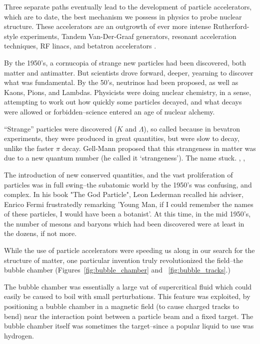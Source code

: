 Three separate paths eventually lead to the development of particle
accelerators, which are to date, the best mechanism we possess in physics to
probe nuclear structure. These accelerators are an outgrowth
of ever more intense Rutherford-style experiments, Tandem Van-Der-Graaf
generators, resonant acceleration techniques, RF linacs, and betatron
accelerators \cite{Bryant1994}.

By the 1950's, a cornucopia of strange new particles had been discovered, both
matter and antimatter. But scientists drove forward, deeper, yearning to
discover what was fundamental. By the 50's, neutrinos had been proposed, as well
as Kaons, Pions, and Lambdas. Physicists were doing nuclear chemistry, in a
sense, attempting to work out how quickly some particles decayed, and what
decays were allowed or forbidden--science entered an age of nuclear alchemy.

``Strange'' particles were discovered ($K$ and $\Lambda$), so called because in
bevatron experiments, they were produced in great quantities, but were slow to
decay, unlike the faster $\pi$ decay. Gell-Mann proposed that this strangeness
in matter was due to a new quantum number (he called it `strangeness'). The name
stuck.
 \cite{Gell-Mann1953}, \cite{Gell-Mann1956}, \cite{Krauss2015}

The introduction of new conserved quantities, and the vast proliferation of
particles was in full swing--the subatomic world by the 1950's was confusing,
and complex. In his book "The God Particle", Leon Lederman recalled his adviser,
Enrico Fermi frustratedly remarking 'Young Man, if I could remember the names of
these particles, I would have been a botanist'. At this time, in the mid 1950's,
the number of mesons and baryons which had been discovered were at least in the
dozens, if not more.

While the use of particle accelerators were speeding us along in  our search for
the structure of matter, one particular invention truly revolutionized the
field--the bubble chamber (Figures~\ref{fig:bubble_chamber} and
~\ref{fig:bubble_tracks}.)

The bubble chamber was essentially a large vat of supercritical fluid which
could easily be caused to boil with small perturbations. This feature was
exploited, by positioning a bubble chamber in a magnetic field (to cause charged
tracks to bend) near the interaction point between a particle beam and a fixed
target. The bubble chamber itself was sometimes the target--since a popular
liquid to use was hydrogen. 

